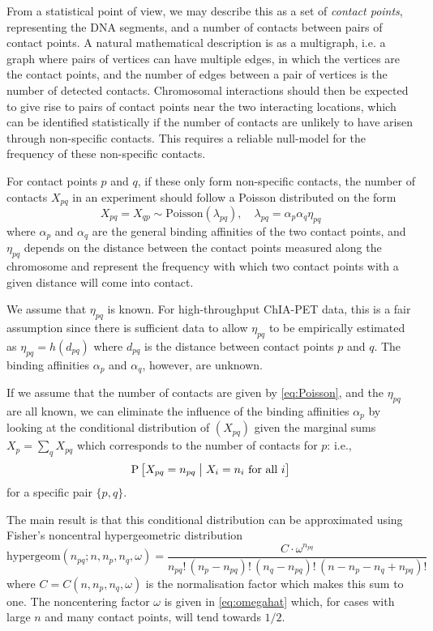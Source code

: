 \documentclass{myaptpub}%
\newcommand\term[1]{\textit{#1}}
\newcommand\Prob{\sP}
\newcommand\PR[1]{\Prob\left[#1\right]}
\newcommand\bigmid{\bigm|}
\begin{document}
From a statistical point of view, we may describe this as a set of \term{contact points}, representing the DNA segments, and a number of contacts between pairs of contact points. A natural mathematical description is as a multigraph, i.e. a graph where pairs of vertices can have multiple edges, in which the vertices are the contact points, and the number of edges between a pair of vertices is the number of detected contacts. Chromosomal interactions should then be expected to give rise to pairs of contact points near the two interacting locations, which can be identified statistically if the number of contacts are unlikely to have arisen through non-specific contacts. This requires a reliable null-model for the frequency of these non-specific contacts.

For contact points $p$ and $q$, if these only form non-specific contacts, the number of contacts $X_{pq}$ in an experiment should follow a Poisson distributed on the form
\begin{equation}\label{eq:Poisson}
X_{pq}=X_{qp}\sim \mathrm{Poisson}(\lambda_{pq}),\quad
\lambda_{pq}=\alpha_p \alpha_q \eta_{pq}
\end{equation}
where $\alpha_p$ and $\alpha_q$ are the general binding affinities of the two contact points, and $\eta_{pq}$ depends on the distance between the contact points measured along the chromosome and represent the frequency with which two contact points with a given distance will come into contact.

We assume that $\eta_{pq}$ is known. For high-throughput ChIA-PET data, this is a fair assumption since there is sufficient data to allow $\eta_{pq}$ to be empirically estimated as $\eta_{pq}=h(d_{pq})$ where $d_{pq}$ is the distance between contact points $p$ and $q$. The binding affinities $\alpha_p$ and $\alpha_q$, however, are unknown.

If we assume that the number of contacts are given by \eqref{eq:Poisson}, and the $\eta_{pq}$ are all known, we can eliminate the influence of the binding affinities $\alpha_p$ by looking at the conditional distribution of $(X_{pq})$ given the marginal sums $X_p=\sum_q X_{pq}$ which corresponds to the number of contacts for $p$: i.e.,
\begin{equation}\nonumber%
\PR{X_{pq}=n_{pq}\bigmid X_i=n_i\text{ for all }i}
\end{equation}
for a specific pair $\{p,q\}$.

The main result is that this conditional distribution can be approximated using Fisher's noncentral hypergeometric distribution
\begin{equation}\nonumber
\textrm{hypergeom}(n_{pq};n,n_p,n_q,\omega)
=\frac{C\cdot\omega^{n_{pq}}}{n_{pq}!\,(n_p-n_{pq})!\,(n_q-n_{pq})!\,(n-n_p-n_q+n_{pq})!}
\end{equation}
where $C=C(n,n_p,n_q,\omega)$ is the normalisation factor which makes this sum to one. The noncentering factor $\omega$ is given in \eqref{eq:omegahat} which, for cases with large $n$ and many contact points, will tend towards $1/2$.
\end{document}
